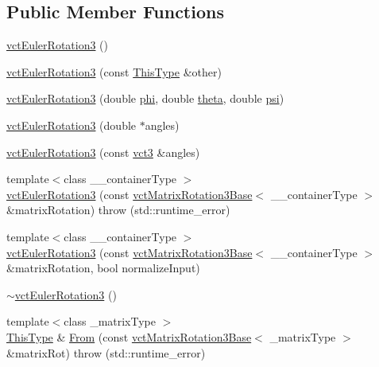 \subsection*{Public Member Functions}
\begin{DoxyCompactItemize}
\item 
\hyperlink{classvct_euler_rotation3_ab3529b2681173b63a24cc13ae21b90cc}{vct\-Euler\-Rotation3} ()
\item 
\hyperlink{classvct_euler_rotation3_adbf0bb7cc5585c547b65dfe6fe82443b}{vct\-Euler\-Rotation3} (const \hyperlink{classvct_euler_rotation3}{This\-Type} \&other)
\item 
\hyperlink{classvct_euler_rotation3_ae1f5dcea90b5d348646a0615fbf53b25}{vct\-Euler\-Rotation3} (double \hyperlink{classvct_euler_rotation3_base_af2e807e479e504cd47c58b308f25317c}{phi}, double \hyperlink{classvct_euler_rotation3_base_ac74e14d30f7d2077068e2f4b5c7219b1}{theta}, double \hyperlink{classvct_euler_rotation3_base_aeee06e33924728dd210644a390f86522}{psi})
\item 
\hyperlink{classvct_euler_rotation3_a9045944731fa1e4cc42b4122e6f1bdf0}{vct\-Euler\-Rotation3} (double $\ast$angles)
\item 
\hyperlink{classvct_euler_rotation3_ad429f73f7648ca57a353b5629d0c0b29}{vct\-Euler\-Rotation3} (const \hyperlink{vct_fixed_size_vector_types_8h_a3af82acdbf4eeb73c551909240b106ea}{vct3} \&angles)
\item 
{\footnotesize template$<$class \-\_\-\-\_\-container\-Type $>$ }\\\hyperlink{classvct_euler_rotation3_aaf3ee83505b9207c0f7ad9419657e36b}{vct\-Euler\-Rotation3} (const \hyperlink{classvct_matrix_rotation3_base}{vct\-Matrix\-Rotation3\-Base}$<$ \-\_\-\-\_\-container\-Type $>$ \&matrix\-Rotation)  throw (std\-::runtime\-\_\-error)
\item 
{\footnotesize template$<$class \-\_\-\-\_\-container\-Type $>$ }\\\hyperlink{classvct_euler_rotation3_aef23cd376661dd4b2254ae4a60747764}{vct\-Euler\-Rotation3} (const \hyperlink{classvct_matrix_rotation3_base}{vct\-Matrix\-Rotation3\-Base}$<$ \-\_\-\-\_\-container\-Type $>$ \&matrix\-Rotation, bool normalize\-Input)
\item 
\hyperlink{classvct_euler_rotation3_a33ac21cb6c3cb226b4e4acf257891b1e}{$\sim$vct\-Euler\-Rotation3} ()
\item 
{\footnotesize template$<$class \-\_\-matrix\-Type $>$ }\\\hyperlink{classvct_euler_rotation3}{This\-Type} \& \hyperlink{classvct_euler_rotation3_a7c0c91c4f98a99a3fefe2699bb192e90}{From} (const \hyperlink{classvct_matrix_rotation3_base}{vct\-Matrix\-Rotation3\-Base}$<$ \-\_\-matrix\-Type $>$ \&matrix\-Rot)  throw (std\-::runtime\-\_\-error)

\end{DoxyCompactItemize}
